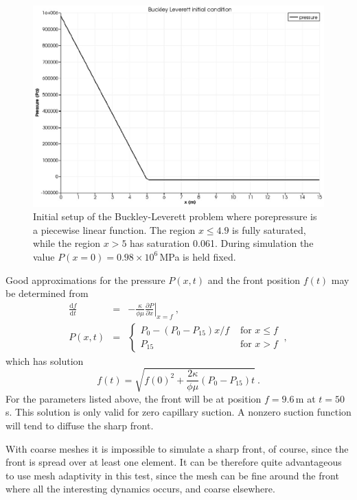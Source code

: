 \documentclass[]{scrreprt}
\begin{document}
\begin{figure}[htb]
\begin{center}
\includegraphics[width=12cm]{bl_initial.eps}
\caption{Initial setup of the Buckley-Leverett problem where
  porepressure is a piecewise linear function.  The region
$x\leq 4.9$ is fully saturated, while the region $x>5$ has saturation
  0.061.  During simulation the value $P(x=0)=0.98\times 10^{6}$\,MPa
  is held fixed.}
\label{bl_setup.figa}
\end{center}
\end{figure}

Good approximations for the pressure $P(x,t)$
and the front position $f(t)$ may be determined from
\begin{eqnarray}
\frac{{\mathrm d} f}{{\mathrm d} t} & = & -\frac{\kappa}{\phi\mu}
\left.\frac{\partial  P}{\partial x}\right|_{x = f} \ , \nonumber \\
P(x,t) & = & \left\{
\begin{array}{ll}
P_{0} - (P_{0}-P_{15})x/f & \mbox{ for } x\leq f  \\
P_{15} & \mbox{ for } x>f 
\end{array}
\right. \ ,
\label{eqn.predicted.bl.posn.eqna}
\end{eqnarray}
which has solution
\begin{equation}
f(t) = \sqrt{f(0)^{2} + \frac{2\kappa}{\phi\mu}(P_{0}-P_{15})t} \ .
\end{equation}
For the parameters listed above, the front will be at position
$f=9.6$\,m at $t=50$\,s.  This solution is only valid for zero
capillary suction.  A nonzero suction function will tend to diffuse
the sharp front.

With coarse meshes it is impossible to simulate a sharp front, of
course, since the front is spread over at least one element.  It can be
therefore quite advantageous to use mesh adaptivity in this test,
since the mesh can be fine around the front where all the interesting
dynamics occurs, and coarse elsewhere.
\end{document}
